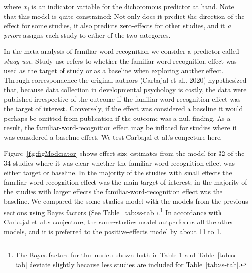 \documentclass[english,,man]{apa6}
\begin{document}
where \(x_i\) is an indicator variable for the dichotomous predictor at hand. Note that this model is quite constrained: Not only does it predict the direction of the effect for some studies, it also predicts zero-effects for other studies, and it \emph{a priori} assigns each study to either of the two categories.

In the meta-analysis of familiar-word-recognition we consider a predictor called \emph{study use}. Study use refers to whether the familiar-word-recognition effect was used as the target of study or as a baseline when exploring another effect. Through correspondence the original authors (Carbajal et al., 2020) hypothesized that, because data collection in developmental psychology is costly, the data were published irrespective of the outcome if the familiar-word-recognition effect was the target of interest. Conversely, if the effect was considered a baseline it would perhaps be omitted from publication if the outcome was a null finding. As a result, the familiar-word-recognition effect may be inflated for studies where it was considered a baseline effect. We test Carbajal et al.'s conjecture here.

Figure~\ref{fig:figModerator} shows effect size estimates from the model for 32 of the 34 studies where it was clear whether the familiar-word-recognition effect was either target or baseline. In the majority of the studies with small effects the familiar-word-recognition effect was the main target of interest; in the majority of the studies with larger effects the familiar-word-recognition effect was the baseline. We compared the some-studies model with the models from the previous sections using Bayes factors (See Table~\ref{tab:ss-tab}).\footnote{The Bayes factors for the models shown both in Table 1 and Table~\ref{tab:ss-tab} deviate slightly because less studies are included for Table~\ref{tab:ss-tab}.} In accordance with Carbajal et al.'s conjecture, the some-studies model outperforms all the other models, and it is preferred to the positive-effects model by about 11 to 1.
\end{document}
